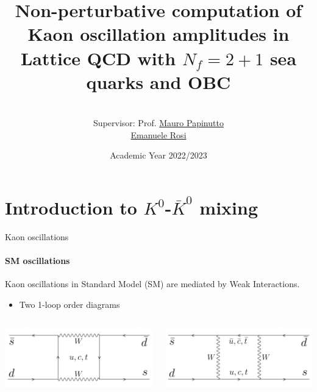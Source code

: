 \documentclass{beamer}
\title{Non-perturbative computation of Kaon oscillation amplitudes in Lattice QCD with $N_f = 2+1$ sea quarks and OBC}
\author{\\{\rm Supervisor: Prof.} \href{mailto:mauro.papinutto@uniroma1.it}{Mauro Papinutto} \\ \href{mailto:emanuele.rosi@roma1.infn.it}{Emanuele Rosi}}
\date{Academic Year 2022/2023}
\begin{document}
\maketitle

\section{Introduction to $K^0$-$\bar K^0$ mixing}

\begin{frame}{Kaon oscillations}
      \framesubtitle{SM oscillations}
      Kaon oscillations in Standard Model (SM) are mediated by Weak Interactions.
      \begin{itemize}
            \item Two 1-loop order diagrams
      \end{itemize}
      \vspace{\baselineskip}
      \begin{columns}
            \centering
            \begin{column}{0.5\textwidth}
                  \centering
                  \includegraphics[width=.8\textwidth,right]{assets/kkbar-1.png}
            \end{column}
            \begin{column}{0.5\textwidth}
                  \centering
                  \includegraphics[width=.8\textwidth,left]{assets/kkbar-2.png}
            \end{column}
      \end{columns}
\end{frame}
\end{document}
